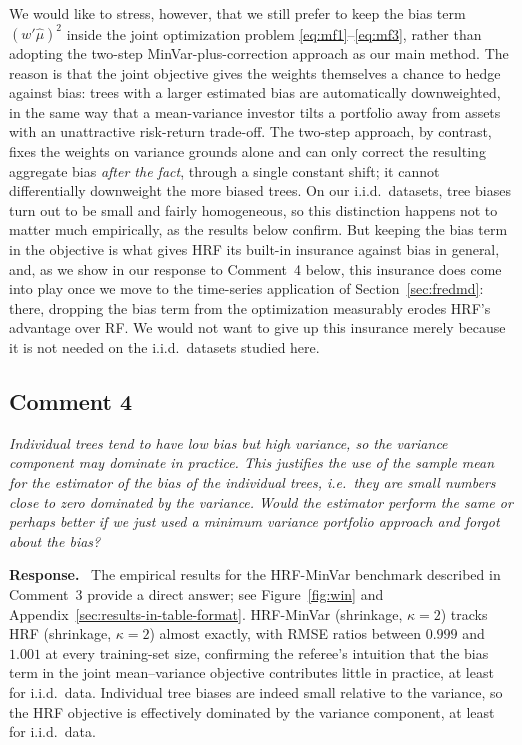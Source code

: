 \documentclass[12pt]{article}
\newcommand{\comment}[1]{\begin{refbox}\textit{#1}\end{refbox}}
\newcommand{\response}{\medskip\noindent\textbf{Response.}\ }
\begin{document}
We would like to stress, however, that we still prefer to keep the bias
term $(w'\hat\mu)^2$ inside the joint optimization problem
\eqref{eq:mf1}--\eqref{eq:mf3}, rather than adopting the two-step
MinVar-plus-correction approach as our main method. The reason is that
the joint objective gives the weights themselves a chance to hedge
against bias: trees with a larger estimated bias are automatically
downweighted, in the same way that a mean-variance investor tilts a
portfolio away from assets with an unattractive risk-return trade-off.
The two-step approach, by contrast, fixes the weights on variance
grounds alone and can only correct the resulting aggregate bias
\emph{after the fact}, through a single constant shift; it cannot
differentially downweight the more biased trees. On our i.i.d.\ datasets, tree
biases turn out to be small and fairly homogeneous, so this distinction
happens not to matter much empirically, as the results below confirm.
But keeping the bias term in the objective is what gives HRF its
built-in insurance against bias in general, and, as we show in our
response to Comment~4 below, this insurance does come into play once we
move to the time-series application of Section~\ref{sec:fredmd}: there,
dropping the bias term from the optimization measurably erodes HRF's
advantage over RF. We would not want to give up this insurance merely
because it is not needed on the i.i.d.\ datasets studied here.

\subsection*{Comment 4}

\comment{Individual trees tend to have low bias but high variance, so the
variance component may dominate in practice.  This justifies the use of the
sample mean for the estimator of the bias of the individual trees, i.e.\ they
are small numbers close to zero dominated by the variance.  Would the
estimator perform the same or perhaps better if we just used a minimum
variance portfolio approach and forgot about the bias?}

\response
The empirical results for the HRF-MinVar benchmark described in Comment~3
provide a direct answer; see Figure~\ref{fig:win} and
Appendix~\ref{sec:results-in-table-format}.
HRF-MinVar (shrinkage, $\kappa = 2$) tracks HRF (shrinkage, $\kappa = 2$)
almost exactly, with RMSE ratios between $0.999$ and $1.001$ at every
training-set size, confirming the referee's intuition that the bias term in
the joint mean--variance objective contributes little in practice, at least
for i.i.d.\ data. 
Individual tree biases are indeed small relative to the variance, so the
HRF objective is effectively dominated by the variance component,
at least for i.i.d.\ data. 
\end{document}
